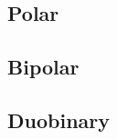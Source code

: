 \documentclass{article}
\begin{document}
\subsection{Polar}

\subsection{Bipolar}

\subsection{Duobinary}
\end{document}

